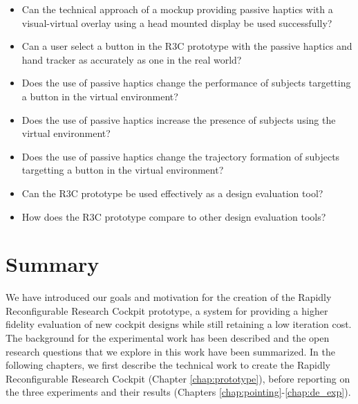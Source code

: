 \begin{itemize}
    \item Can the technical approach of a mockup providing passive haptics with a visual-virtual overlay using a head mounted display be used successfully?
    \item Can a user select a button in the R3C prototype with the passive haptics and hand tracker as accurately as one in the real world?
    \item Does the use of passive haptics change the performance of subjects targetting a button in the virtual environment?
    \item Does the use of passive haptics increase the presence of subjects using the virtual environment?
    \item Does the use of passive haptics change the trajectory formation of subjects targetting a button in the virtual environment?
    \item Can the R3C prototype be used effectively as a design evaluation tool?
    \item How does the R3C prototype compare to other design evaluation tools?
\end{itemize}

\section{Summary}

We have introduced our goals and motivation for the creation of the Rapidly Reconfigurable Research Cockpit prototype, a system for providing a higher fidelity evaluation of new cockpit designs while still retaining a low iteration cost.
The background for the experimental work has been described and the open research questions that we explore in this work have been summarized.
In the following chapters, we first describe the technical work to create the Rapidly Reconfigurable Research Cockpit (Chapter \ref{chap:prototype}), before reporting on the three experiments and their results (Chapters \ref{chap:pointing}-\ref{chap:de_exp}).
